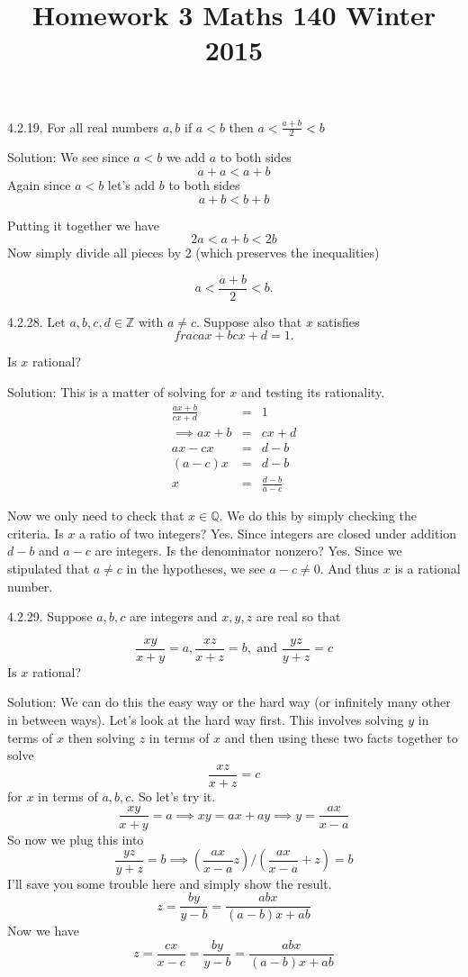 \documentclass[16 pt]{amsart}
\theoremstyle{definition}
\theoremstyle{remark}
\numberwithin{equation}{subsection}
\newcommand{\Z}{\mathbb{Z}}
\newcommand{\Q}{\mathbb{Q}}
\begin{document}
\title{Homework 3 Maths 140 Winter 2015}
\maketitle 


4.2.19. For all real numbers $a,b$ if $a<b$ then $a<\frac{a+b}{2}<b$

\vspace{1in}

Solution:  We see since $a<b$ we add $a$ to both sides 
\[
a+a < a+ b  
\]
Again since $a<b$ let's add $b$ to both sides
\[
a+b < b+b
\]

Putting it together we have
\[
2a < a+b < 2 b
\]
Now simply divide all pieces by 2 (which preserves the inequalities)

\[
a < \frac{a+b}{2} < b.
\]


\newpage

4.2.28. Let $a,b,c,d\in\Z$ with $a \neq c$.  Suppose also that $x$ satisfies
\[frac{ax+b}{cx+d} = 1.
\]



Is $x$ rational?

\vspace{1in}

Solution:  This is a matter of solving for $x$ and testing its rationality.
\begin{eqnarray*}
\frac{ax+b}{cx+d} & = & 1\\
\implies ax+b & = & cx+d\\
ax-cx & = & d - b\\
(a-c)x & = & d-b\\
x & = & \frac{d-b}{a-c}
\end{eqnarray*}


Now we only need to check that $x\in\Q$.  We do this by simply checking the criteria.  Is $x$ a ratio of two integers?  Yes. Since integers are closed under addition $d-b$ and $a-c$ are integers.  Is the denominator nonzero?  Yes.  Since we stipulated that $a\neq c$ in the hypotheses, we see $a-c\neq 0$.  And thus $x$ is a rational number.

\newpage


4.2.29. Suppose $a,b,c$ are integers and $x,y,z$ are real so that

\[
\frac{xy}{x+y} = a, \frac{xz}{x+z}=b, \text{ and } \frac{yz}{y+z}=c
\]
Is $x$ rational?

\vspace{1in}

Solution:  We can do this the easy way or the hard way (or infinitely many other in between ways).
Let's look at the hard way first.  This involves solving $y$ in terms of $x$ then solving $z$ in terms of $x$ and then using these two facts together to solve
\[
\frac{xz}{x+z} = c
\]
for $x$ in terms of $a,b,c$.  So let's try it.
\[
\frac{xy}{x+y} = a  \implies xy = ax + ay \implies y = \frac{ax}{x-a}
\]
So now we plug this into 
\[
\frac{yz}{y+z} = b \implies \left(\frac{ax}{x-a}z\right) / \left(\frac{ax}{x-a}+ z\right) = b
\]
I'll save you some trouble here and simply show the result.
\[
z = \frac{by}{y-b} = \frac{abx}{(a-b)x + ab}
\]
Now we have 
\[
z= \frac{cx}{x-c} = \frac{by}{y-b} = \frac{abx}{(a-b)x + ab}
\]
\end{document}
